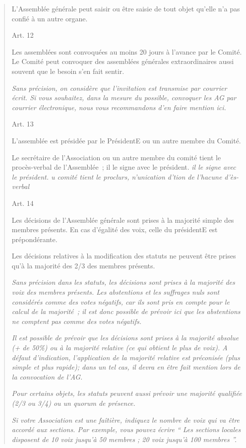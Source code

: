 \documentclass[
]{article}
\begin{document}
\begin{quote}
L'Assemblée générale peut saisir ou être saisie de tout objet qu'elle
n'a pas confié à un autre organe.

Art. 12

Les assemblées sont convoquées au moins 20 jours à l'avance par le
Comité. Le Comité peut convoquer des assemblées générales
extraordinaires aussi souvent que le besoin s'en fait sentir.

\emph{Sans précision, on considère que l'invitation est transmise par
courrier écrit. Si vous souhaitez, dans la mesure du possible, convoquer
les AG par courrier électronique, nous vous recommandons d'en faire
mention ici.}

Art. 13

L'assemblée est présidée par le PrésidentE ou un autre membre du Comité.

Le secrétaire de l'Association ou un autre membre du comité tient le
procès-verbal de l'Assemblée~; il le signe avec le président. \emph{il
le signe avec le président. u comité tient le proclurs, n'unication
d'tion de l'hacune d'ès-verbal}

Art. 14

Les décisions de l'Assemblée générale sont prises à la majorité simple
des membres présents. En cas d'égalité des voix, celle du présidentE est
prépondérante.

Les décisions relatives à la modification des statuts ne peuvent être
prises qu'à la majorité des 2/3 des membres présents.

\emph{Sans précision dans les statuts, les décisions sont prises à la
majorité des voix des membres présents. Les abstentions et les suffrages
nuls sont considérés comme des votes négatifs, car ils sont pris en
compte pour le calcul de la majorité~; il est donc possible de prévoir
ici que les abstentions ne comptent pas comme des votes négatifs.}

\emph{Il est possible de prévoir que les décisions sont prises à la
majorité absolue (+ de 50\%) ou à la majorité relative (ce qui obtient
le plus de voix). A défaut d'indication, l'application de la majorité
relative est préconisée (plus simple et plus rapide); dans un tel cas,
il devra en être fait mention lors de la convocation de l'AG.~}

\emph{Pour certains objets, les statuts peuvent aussi prévoir une
majorité qualifiée (2/3 ou 3/4) ou un quorum de présence.}

\emph{Si votre Association est une faîtière, indiquez le nombre de voix
qui va être accordé aux sections. Par exemple, vous pouvez écrire `` Les
sections locales disposent de 10 voix jusqu'à 50 membres ; 20 voix
jusqu'à 100 membres ''.}


\end{quote}
\end{document}
